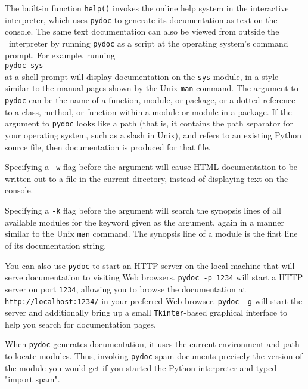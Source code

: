 The built-in function {\tt help()} invokes the online help system in the interactive interpreter, 
which uses {\tt pydoc} to generate its documentation as text on the console. 
The same text documentation can also be viewed from outside the \python\ interpreter 
by running {\tt pydoc} as a script at the operating system's command prompt. 
For example, running\\
{\tt pydoc sys}\\
at a shell prompt will display documentation on the {\tt sys} module, 
in a style similar to the manual pages shown by the Unix {\tt man} command. 
The argument to {\tt pydoc} can be the name of a function, module, or package, 
or a dotted reference to a class, method, or function within a module or module in a package. 
If the argument to {\tt pydoc} looks like a path (that is, it contains the path 
separator for your operating system, such as a slash in Unix), 
and refers to an existing {\sc Python} source file, 
then documentation is produced for that file.

Specifying a {\tt -w} flag before the argument will cause HTML documentation 
to be written out to a file in the current directory, instead of displaying 
text on the console.

Specifying a {\tt -k} flag before the argument will search the synopsis 
lines of all available modules for the keyword given as the argument, 
again in a manner similar to the Unix {\tt man} command. 
The synopsis line of a module is the first line of its documentation string.

You can also use {\tt pydoc} to start an HTTP server on the local machine 
that will serve documentation to visiting Web browsers. {\tt pydoc -p 1234} 
will start a HTTP server on port {\tt 1234}, allowing you to browse the 
documentation at {\tt http://localhost:1234/} in your preferred Web browser. 
{\tt pydoc -g} will start the server and additionally bring up a small 
{\tt Tkinter}-based graphical interface to help you search for documentation pages.

When {\tt pydoc} generates documentation, it uses the current environment 
and path to locate modules. Thus, invoking {\tt pydoc} spam documents 
precisely the version of the module you would get if you started the 
{\sc Python} interpreter and typed "import spam".

